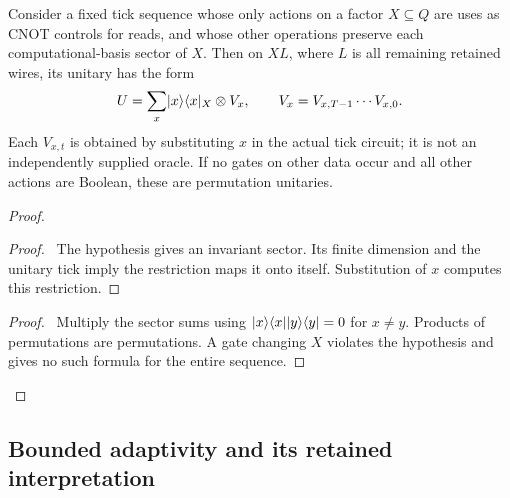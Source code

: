 \begin{lemma}\label{lem:read-product}
Consider a fixed tick sequence whose only actions on a factor $X\subseteq Q$
are uses as CNOT controls for reads, and whose other operations preserve
each computational-basis sector of $X$. Then on $X L$, where $L$ is all
remaining retained wires, its unitary has the form
\[
 U=\sum_x\lvert x\rangle\langle x\rvert_X\otimes V_x,\qquad
 V_x=V_{x,T-1}\cdots V_{x,0}.
\]
Each $V_{x,t}$ is obtained by substituting $x$ in the actual tick circuit;
it is not an independently supplied oracle. If no gates on other data
occur and all other actions are Boolean, these are permutation unitaries.
\end{lemma}
\begin{proof}
 \begin{proof}\pf\ The hypothesis gives an invariant sector. Its
 finite dimension and the unitary tick imply the restriction maps it
 onto itself. Substitution of $x$ computes this restriction.\end{proof}
 \qedstep
 \begin{proof}\pf\ Multiply the sector sums using
 $\lvert x\rangle\langle x\rvert\lvert y\rangle\langle y\rvert=0$ for $x\ne y$. Products of permutations are
 permutations. A gate changing $X$ violates the hypothesis and gives
 no such formula for the entire sequence.\end{proof}
\end{proof}

\subsection{Bounded adaptivity and its retained interpretation}

